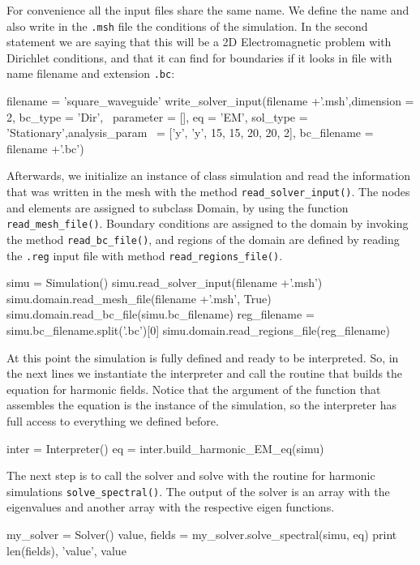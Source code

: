 For convenience all the input files share the same name. We define the name and also write in the \verb|.msh| file the conditions of the simulation. In the second statement we are saying that this will be a 2D Electromagnetic problem with Dirichlet conditions, and that it can find for boundaries if it looks in file with name filename and extension \verb|.bc|:
\begin{python}
filename = 'square_waveguide'
write_solver_input(filename +'.msh',dimension = 2, bc_type = 'Dir', \
parameter = [], eq = 'EM', sol_type = 'Stationary',analysis_param \
= ['y', 'y', 15, 15, 20, 20, 2], bc_filename = filename +'.bc')  
\end{python}

Afterwards, we initialize an instance of class simulation and read the  information that was written in the mesh  with the method \verb|read_solver_input()|. The nodes and elements are assigned to subclass Domain, by using the function \verb|read_mesh_file()|. Boundary conditions are assigned to the domain by invoking the method \verb|read_bc_file()|, and regions of the domain are defined by reading the \verb|.reg| input file with method \verb|read_regions_file()|.

\begin{python}
simu = Simulation()
simu.read_solver_input(filename +'.msh')
simu.domain.read_mesh_file(filename +'.msh', True)
simu.domain.read_bc_file(simu.bc_filename)
reg_filename = simu.bc_filename.split('.bc')[0]
simu.domain.read_regions_file(reg_filename)
\end{python}

At this point the simulation is fully defined and ready to be interpreted. So, in the next lines we instantiate the interpreter and call the routine that builds the equation for harmonic fields. Notice that the argument of the function that assembles the equation is the instance of the simulation, so the interpreter has full access to everything we defined before.

\begin{python}
inter = Interpreter()
eq = inter.build_harmonic_EM_eq(simu)
\end{python}

The next step is to call the solver and solve with the routine for harmonic simulations \verb|solve_spectral()|. The output of the solver is an array with the eigenvalues and another array with the respective eigen functions.

\begin{python}
my_solver = Solver()
value, fields = my_solver.solve_spectral(simu, eq)
print len(fields), 'value', value
\end{python}

